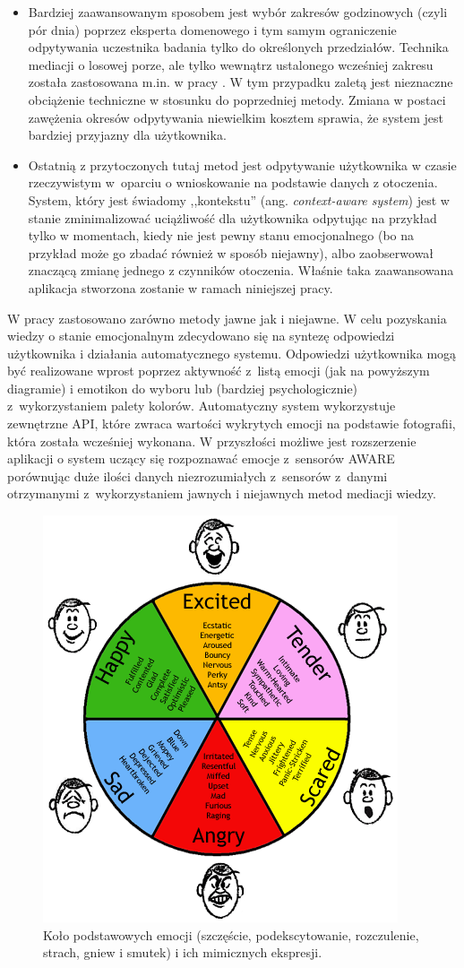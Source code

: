 \begin{itemize}
	\item Bardziej zaawansowanym sposobem jest wybór zakresów godzinowych (czyli pór dnia) poprzez eksperta domenowego i tym samym ograniczenie odpytywania uczestnika badania tylko do określonych przedziałów. Technika mediacji o losowej porze, ale tylko wewnątrz ustalonego wcześniej zakresu została zastosowana m.in. w pracy \cite{bailon2019smartphone}. W tym przypadku zaletą jest nieznaczne obciążenie techniczne w stosunku do poprzedniej metody. Zmiana w postaci zawężenia okresów odpytywania niewielkim kosztem sprawia, że system jest bardziej przyjazny dla użytkownika.
	
	\item Ostatnią z przytoczonych tutaj metod jest odpytywanie użytkownika w czasie rzeczywistym w~oparciu o wnioskowanie na podstawie danych z otoczenia. System, który jest świadomy ,,kontekstu'' (ang. \textit{context-aware system}) jest w stanie zminimalizować uciążliwość dla użytkownika odpytując na przykład tylko w momentach, kiedy nie jest pewny stanu emocjonalnego (bo na przykład może go zbadać również w sposób niejawny), albo zaobserwował znaczącą zmianę jednego z czynników otoczenia. Właśnie taka zaawansowana aplikacja stworzona zostanie w ramach niniejszej pracy.
\end{itemize}

W pracy zastosowano zarówno metody jawne jak i niejawne. W celu pozyskania wiedzy o stanie emocjonalnym zdecydowano się na syntezę odpowiedzi użytkownika i działania automatycznego systemu. Odpowiedzi użytkownika mogą być realizowane wprost poprzez aktywność z~listą emocji (jak na powyższym diagramie) i emotikon do wyboru lub (bardziej psychologicznie) z~wykorzystaniem palety kolorów. Automatyczny system wykorzystuje zewnętrzne API, które zwraca wartości wykrytych emocji na podstawie fotografii, która została wcześniej wykonana. W przyszłości możliwe jest rozszerzenie aplikacji o system uczący się rozpoznawać emocje z~sensorów AWARE porównując duże ilości danych niezrozumiałych z~sensorów z~danymi otrzymanymi z~wykorzystaniem jawnych i niejawnych metod mediacji wiedzy.

\begin{figure}[H]
	\centering
	\includegraphics[scale=1]{rozdzial2/ModelEkmana.png}
	\caption{Koło podstawowych emocji (szczęście, podekscytowanie, rozczulenie, strach, gniew i smutek) i ich mimicznych ekspresji.}
\end{figure}

